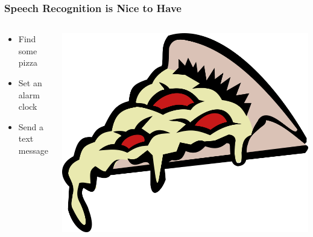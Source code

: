 \documentclass[pdflatex,compress]{beamer}
\begin{document}
\begin{frame}
  \frametitle{Speech Recognition is Nice to Have}
  \begin{columns}[onlytextwidth]
    \begin{column}{0.6\textwidth}
      \begin{itemize}
      \item Find some pizza
      \item Set an alarm clock
      \item Send a text message
      \end{itemize}
    \end{column}
    \begin{column}{0.4\textwidth}
      \centering
      \vspace{-.35cm}
      \includegraphics[scale=.125]{pizza.png}\\
      \vspace{.10cm}

\end{column}
\end{columns}
\end{frame}
\end{document}
